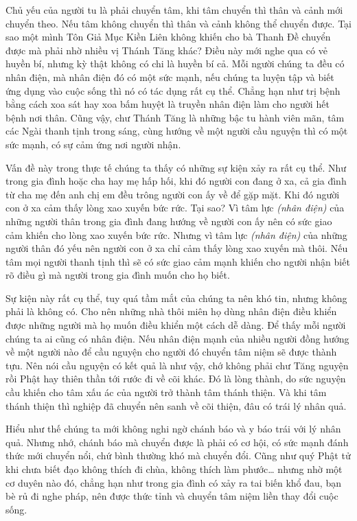 \documentclass[
  12pt,
  oneside]{book}
\begin{document}
Chủ yếu của người tu là phải chuyển tâm, khi tâm chuyển thì thân và cảnh mới chuyển theo. Nếu tâm không chuyển thì thân và cảnh không thể chuyển được. Tại sao một mình Tôn Giả Mục Kiền Liên không khiến cho bà Thanh Đề chuyển được mà phải nhờ nhiều vị Thánh Tăng khác? Điều này mới nghe qua có vẻ huyền bí, nhưng kỳ thật không có chi là huyền bí cả. Mỗi người chúng ta đều có nhân điện, mà nhân điện đó có một sức mạnh, nếu chúng ta luyện tập và biết ứng dụng vào cuộc sống thì nó có tác dụng rất cụ thể. Chẳng hạn như trị bệnh bằng cách xoa sát hay xoa bấm huyệt là truyền nhân điện làm cho người hết bệnh nơi thân. Cũng vậy, chư Thánh Tăng là những bậc tu hành viên mãn, tâm các Ngài thanh tịnh trong sáng, cùng hướng về một người cầu nguyện thì có một sức mạnh, có sự cảm ứng nơi người nhận.

Vấn đề này trong thực tế chúng ta thấy có những sự kiện xảy ra rất cụ thể. Như trong gia đình hoặc cha hay mẹ hấp hối, khi đó người con đang ở xa, cả gia đình từ cha mẹ đến anh chị em đều trông người con ấy về để gặp mặt. Khi đó người con ở xa cảm thấy lòng xao xuyến bức rức. Tại sao? Vì tâm lực \emph{(nhân điện)} của những người thân trong gia đình đang hướng về người con ấy nên có sức giao cảm khiến cho lòng xao xuyến bức rức. Nhưng vì tâm lực \emph{(nhân điện)} của những người thân đó yếu nên người con ở xa chỉ cảm thấy lòng xao xuyến mà thôi. Nếu tâm mọi người thanh tịnh thì sẽ có sức giao cảm mạnh khiến cho người nhận biết rõ điều gì mà người trong gia đình muốn cho họ biết.

Sự kiện này rất cụ thể, tuy quá tầm mắt của chúng ta nên khó tin, nhưng không phải là không có. Cho nên những nhà thôi miên họ dùng nhân điện điều khiển được những người mà họ muốn điều khiển một cách dễ dàng. Để thấy mỗi người chúng ta ai cũng có nhân điện. Nếu nhân điện mạnh của nhiều người đồng hướng về một người nào để cầu nguyện cho người đó chuyển tâm niệm sẽ được thành tựu. Nên nói cầu nguyện có kết quả là như vậy, chớ không phải chư Tăng nguyện rồi Phật hay thiên thần tới rước đi về cõi khác. Đó là lòng thành, do sức nguyện cầu khiến cho tâm xấu ác của người trở thành tâm thánh thiện. Và khi tâm thánh thiện thì nghiệp đã chuyển nên sanh về cõi thiện, đâu có trái lý nhân quả.

Hiểu như thế chúng ta mới không nghi ngờ chánh báo và y báo trái với lý nhân quả. Nhưng nhớ, chánh báo mà chuyển được là phải có cơ hội, có sức mạnh đánh thức mới chuyển nổi, chứ bình thường khó mà chuyển đổi. Cũng như quý Phật tử khi chưa biết đạo không thích đi chùa, không thích làm phước\ldots{} nhưng nhờ một cơ duyên nào đó, chẳng hạn như trong gia đình có xảy ra tai biến khổ đau, bạn bè rủ đi nghe pháp, nên được thức tỉnh và chuyển tâm niệm liền thay đổi cuộc sống.
\end{document}
